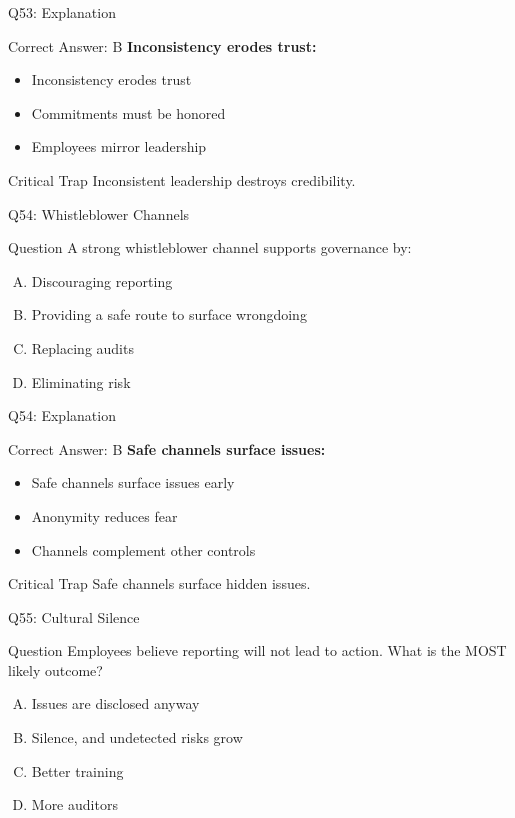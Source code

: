 \documentclass{beamer}
\begin{document}
	\begin{frame}{Q53: Explanation}
		\begin{block}{Correct Answer: B}
			\textbf{Inconsistency erodes trust:}
			\begin{itemize}
				\item Inconsistency erodes trust
				\item Commitments must be honored
				\item Employees mirror leadership
			\end{itemize}
		\end{block}
		\begin{alertblock}{Critical Trap}
			Inconsistent leadership destroys credibility.
		\end{alertblock}
	\end{frame}
	
	\begin{frame}{Q54: Whistleblower Channels}
		\begin{block}{Question}
			A strong whistleblower channel supports governance by:
		\end{block}
		\begin{enumerate}[(A)]
			\item Discouraging reporting
			\item Providing a safe route to surface wrongdoing
			\item Replacing audits
			\item Eliminating risk
		\end{enumerate}
	\end{frame}
	
	\begin{frame}{Q54: Explanation}
		\begin{block}{Correct Answer: B}
			\textbf{Safe channels surface issues:}
			\begin{itemize}
				\item Safe channels surface issues early
				\item Anonymity reduces fear
				\item Channels complement other controls
			\end{itemize}
		\end{block}
		\begin{alertblock}{Critical Trap}
			Safe channels surface hidden issues.
		\end{alertblock}
	\end{frame}
	
	\begin{frame}{Q55: Cultural Silence}
		\begin{block}{Question}
			Employees believe reporting will not lead to action. What is the MOST likely outcome?
		\end{block}
		\begin{enumerate}[(A)]
			\item Issues are disclosed anyway
			\item Silence, and undetected risks grow
			\item Better training
			\item More auditors
		\end{enumerate}
	\end{frame}
	
\end{document}
